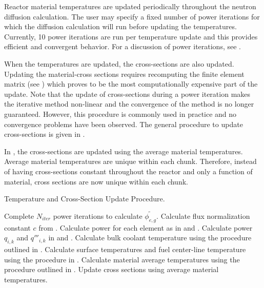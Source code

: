   Reactor material temperatures are updated periodically throughout the 
  neutron diffusion calculation. The user may specify a fixed number of power
  iterations for which the diffusion calculation will run before updating the
  temperatures. Currently, 10 power iterations are run per temperature update
  and this provides efficient and convergent behavior.
  For a discussion of power iterations, see .
  
  When
  the temperatures are updated, the cross-sections are also updated. Updating
  the material-cross sections requires recomputing the finite element matrix
  (see )
  which proves to be the most computationally expensive part of the update. 
  Note that the update of cross-sections during a power iteration makes the
  iterative method non-linear and the convergence of the method is no longer
  guaranteed. However, this procedure is commonly used in practice and no 
  convergence problems have been observed. The general procedure to update
  cross-sections is given in .

  In , the cross-sections are
  updated using the average material temperatures. Average material
  temperatures are unique within each chunk. Therefore, instead of having
  cross-sections constant throughout the reactor and only a function of
  material, cross sections are now unique within each chunk.

  \begin{algorithm}
    \caption{Temperature and Cross-Section Update Procedure.}
    \label{algorithm:temperature_update}
    \begin{algorithmic}[1]
      \State Complete $N_{iter}$ power iterations to calculate
        $\widetilde{\phi_{e,g}}$.
      \State Calculate flux normalization constant $c$ from
        .
      \State Calculate power for each element as in  and
        .
        \State Calculate power $q_{i,k}$ and $q'''_{i,k}$ in 
          and .
        \State Calculate bulk coolant temperature using the 
          procedure outlined in .
        \State Calculate surface temperatures and fuel center-line temperature
          using the procedure in .
        \State Calculate material average temperatures using the procedure 
          outlined in .
        \State Update cross sections using average material temperatures.
      \EndFor
    \end{algorithmic}
  \end{algorithm}

